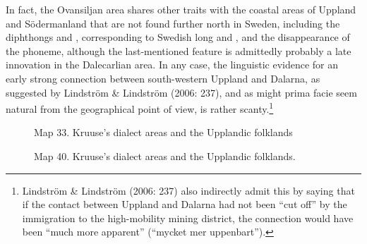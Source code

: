 
In fact, the Ovansiljan area shares other traits with the coastal areas of Uppland and Södermanland that are not found further north in Sweden, including the diphthongs  and , corresponding to Swedish long  and , and the disappearance of the  phoneme, although the last-mentioned feature is admittedly probably a late innovation in the Dalecarlian area. In any case, the linguistic evidence for an early strong connection between south-western Uppland and Dalarna, as suggested by Lindström \& Lindström (2006: 237), and as might prima facie seem natural from the geographical point of view, is rather scanty.\footnote{ Lindström \& Lindström (2006: 237) also indirectly admit this by saying that if the contact between Uppland and Dalarna had not been “cut off” by the immigration to the high-mobility mining district, the connection would have been “much more apparent” (“mycket mer uppenbart”).}




\begin{figure}[h]

\begin{minipage}{4.125in}

Map 33. Kruuse’s dialect areas and the Upplandic folklands


\end{minipage}

\end{figure}

 


\begin{figure}[h]

\begin{minipage}{4.92708in}

\label{bkm:Ref130722437}Map 40. Kruuse’s dialect areas and the Upplandic folklands.


\end{minipage}

\end{figure}

